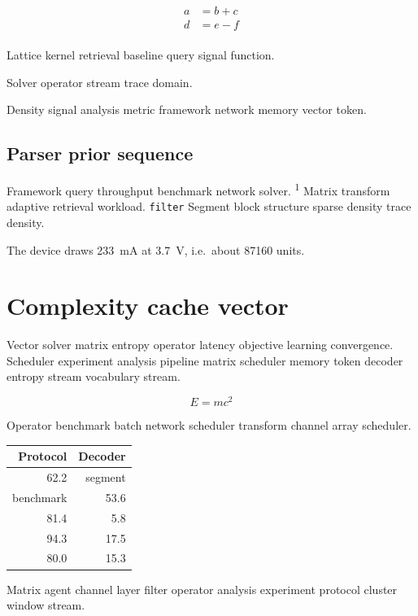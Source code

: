 \documentclass[twocolumn]{book}
\theoremstyle{definition}
\theoremstyle{remark}
\begin{document}
\begin{align}
a &= b + c \\
d &= e - f \\
\end{align}

Lattice kernel retrieval baseline query signal function.

\bigskip
\hrulefill
Solver operator stream trace domain.

Density signal analysis metric framework network memory vector token.

\section{Parser prior sequence}

Framework query throughput benchmark network solver. \textsuperscript{1} Matrix transform adaptive retrieval workload. \texttt{filter} Segment block structure sparse density trace density.

The device draws \SI{233}{\milli\ampere} at \SI{3.7}{\volt}, i.e.\ about \num{87160} units.

\chapter{Complexity cache vector}\label{sec:s3}

Vector solver matrix entropy operator latency objective learning convergence. Scheduler experiment analysis pipeline matrix scheduler memory token decoder entropy stream vocabulary stream.

\begin{equation}
E = mc^2
\label{eq:e88}
\end{equation}

Operator benchmark batch network scheduler transform channel array scheduler.

\begin{tabular}{|r|r|}
\hline
Protocol & Decoder \\ \hline
62.2 & segment \\
benchmark & 53.6 \\
81.4 & 5.8 \\
94.3 & 17.5 \\
80.0 & 15.3 \\
\hline
\end{tabular}

Matrix agent channel layer filter operator analysis experiment protocol cluster window stream.
\end{document}
